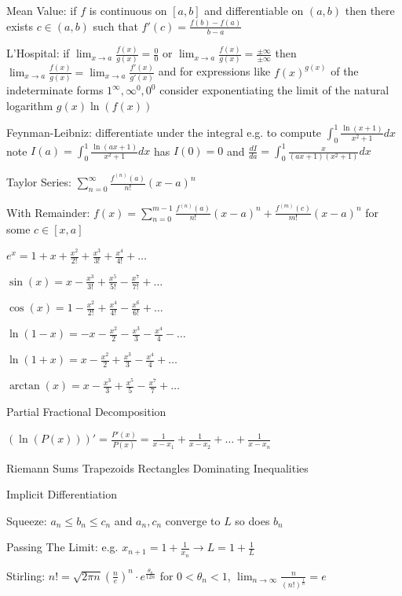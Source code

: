 Mean Value: if $f$ is continuous on $[a,b]$ and differentiable on $(a,b)$ then there exists $c \in (a,b)$ such that $f'(c) = \frac{f(b)-f(a)}{b-a}$

L'Hospital: if $\lim_{x \to a} \frac{f(x)}{g(x)} = \frac{0}{0}$ or $\lim_{x \to a} \frac{f(x)}{g(x)} = \frac{\pm \infty}{\pm \infty}$ then $\lim_{x \to a} \frac{f(x)}{g(x)} = \lim_{x \to a} \frac{f'(x)}{g'(x)}$ and for expressions like $f(x)^{g(x)}$ of the indeterminate forms $1^{\infty},\infty^0,0^0$ consider exponentiating the limit of the natural logarithm $g(x)\ln \left( f(x) \right)$

Feynman-Leibniz: differentiate under the integral e.g. to compute $\int_0^1 \frac{\ln(x+1)}{x^2+1} dx$ note $I(a) = \int_0^1 \frac{\ln(ax+1)}{x^2+1} dx$ has $I(0)=0$ and $\frac{dI}{da} = \int_0^1 \frac{x}{(ax+1)(x^2+1)} dx$

Taylor Series: $\sum_{n=0}^{\infty} \frac{f^{(n)}(a)}{n!} (x-a)^n$

With Remainder: $f(x)=\sum_{n=0}^{m-1} \frac{f^{(n)}(a)}{n!} (x-a)^n + \frac{f^{(m)}(c)}{m!} (x-a)^n$ for some $c \in [x,a]$

$e^x = 1+x+\frac{x^2}{2!}+\frac{x^3}{3!}+\frac{x^4}{4!}+\dots$

$\sin(x) = x-\frac{x^3}{3!}+\frac{x^5}{5!}-\frac{x^7}{7!}+\dots$

$\cos(x) = 1-\frac{x^2}{2!}+\frac{x^4}{4!}-\frac{x^6}{6!}+\dots$

$\ln (1-x) = -x-\frac{x^2}{2}-\frac{x^3}{3}-\frac{x^4}{4}-\dots$

$\ln (1+x) = x-\frac{x^2}{2}+\frac{x^3}{3}-\frac{x^4}{4}+\dots$

$\arctan (x) = x-\frac{x^3}{3}+\frac{x^5}{5}-\frac{x^7}{7}+\dots$

Partial Fractional Decomposition

$(\ln(P(x)))' = \frac{P'(x)}{P(x)} = \frac{1}{x-x_1} + \frac{1}{x-x_2} + \dots + \frac{1}{x-x_n}$

Riemann Sums Trapezoids Rectangles Dominating Inequalities

Implicit Differentiation

Squeeze: $a_n \le b_n \le c_n$ and $a_n,c_n$ converge to $L$ so does $b_n$

Passing The Limit: e.g. $x_{n+1}=1+\frac{1}{x_n} \to L=1+\frac{1}{L}$

Stirling: $n! = \sqrt{2 \pi n} \left(\frac{n}{e} \right)^n \cdot e^{\frac{\theta_n}{12n}}$ for $0 < \theta_n < 1$, $\lim_{n \to \infty} \frac{n}{(n!)^{\frac{1}{n}}} = e$

